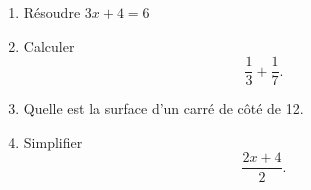 
\begin{exercice}\label{exoPremiere-0064}

    \begin{multicols}{2}
    \begin{enumerate}
        \item
            Résoudre \( 3x+4=6\)
        \item
            Calculer
            \begin{equation}
                \frac{1}{ 3 }+\frac{1}{ 7 }.
            \end{equation}
        \item
            Quelle est la surface d'un carré de côté de \unit{12}{\centi\meter\squared}.
        \item
            Simplifier
            \begin{equation}
                \frac{ 2x+4 }{ 2 }.
            \end{equation}
    \end{enumerate}
    \end{multicols}

\end{exercice}
